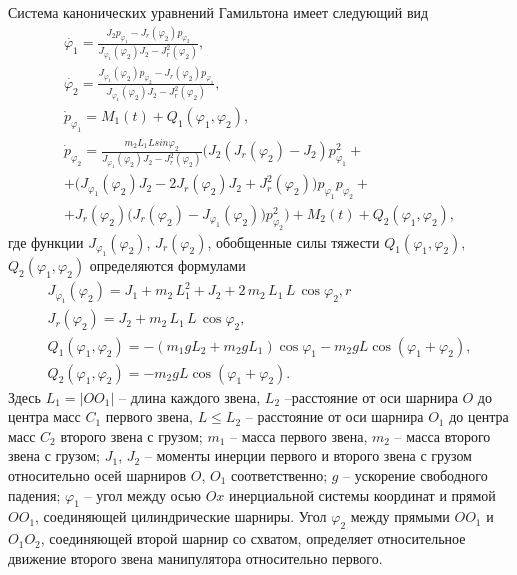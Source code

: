 Система канонических уравнений Гамильтона имеет следующий вид
\begin{equation}
	\begin{gathered}
		\dot{\varphi_1}=\frac{J_2 p_{\varphi_1}-J_r(\varphi_2)p_{\varphi_2}}{J_{\varphi_1}(\varphi_2)J_2-J_r^2(\varphi_2)}, \\
		\dot{\varphi_2}=\frac{J_{\varphi_1}(\varphi_2)p_{\varphi_2}-J_r(\varphi_2)p_{\varphi_1}}{J_{\varphi_1}(\varphi_2)J_2-J_r^2(\varphi_2)},\\
		\dot{p}_{\varphi_1}=M_1 (t) + Q_1 (\varphi_1, \varphi_2), \\
		\dot{p}_{\varphi_2}=\frac{m_2L_1Lsin\varphi_2 }{J_{\varphi_1}(\varphi_2)J_2-J_r^2(\varphi_2)}
		\Big( J_2(J_r(\varphi_2)-J_2)p_{\varphi_1}^2 +\\+\bigl(J_{\varphi_1}(\varphi_2)J_2-2J_r(\varphi_2)J_2+J_r^2(\varphi_2)\bigr)p_{\varphi_1}p_{\varphi_2}+\\+J_r(\varphi_2)\bigl(J_r(\varphi_2)-J_{\varphi_1}(\varphi_2)  \bigr)p_{\varphi_2}^2\Big)+M_2(t)  + Q_2 (\varphi_1, \varphi_2),
	\end{gathered}
	\label{sys}
\end{equation}
где функции $J_{\varphi_1}(\varphi_2)$, $J_{r}(\varphi_2)$, обобщенные силы тяжести $Q_1 (\varphi_1, \varphi_2)$, $ Q_2 (\varphi_1, \varphi_2)$ определяются формулами
\begin{equation*}
	\begin{gathered}
		J_{\varphi_1}(\varphi_2)=J_1 + m_2\,L_1^2 + J_2+2\,m_2\,L_1\,L\, \cos \varphi_2 ,r\\
		J_{r}(\varphi_2)=J_2+m_2\,L_1\,L\,\cos\varphi_2 , \\
		Q_1 (\varphi_1, \varphi_2)=- \left( m_1gL_2+m_2gL_1\right) \cos{\varphi_1}-m_2gL \cos{\left( \varphi_1+\varphi_2\right)},\\
		Q_2 (\varphi_1, \varphi_2)=-m_2gL \cos{\left( \varphi_1+\varphi_2\right)}.
	\end{gathered}
\end{equation*}
Здесь $L_1=|OO_1|$ -- длина каждого звена, $L_2$ --расстояние от оси шарнира $O$ до центра масс $C_1$ первого звена, $L \leq L_2$ -- расстояние от оси шарнира $O_1$ до центра масс $C_2$ второго звена с грузом; $m_1$ -- масса первого звена, $m_2$ -- масса второго звена с грузом; $J_1$, $J_2$ -- моменты инерции первого и второго звена с грузом относительно осей шарниров $O$, $O_1$ соответственно; $g$ -- ускорение свободного падения; $\varphi_1$ -- угол между осью $Ox$ инерциальной системы координат и прямой $OO_1$, соединяющей цилиндрические шарниры. Угол $\varphi_2$  между прямыми $OO_1$ и $O_1O_2$, соединяющей второй шарнир со схватом, определяет относительное движение второго звена манипулятора относительно первого.

